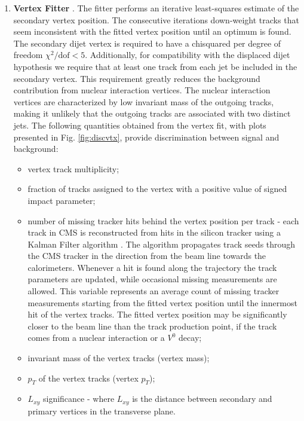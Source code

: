 \begin{enumerate}

\item{\bf Vertex Fitter}
\label{subsec:AVF}
\cite{Waltenberger:1166320}. The fitter performs an iterative least-squares estimate of the
 secondary vertex position. The consecutive iterations down-weight tracks that seem inconsistent
with the fitted vertex position until an optimum is found.
 The secondary dijet vertex is required to have a chisquared per degree of freedom 
$\chi^2/\text{dof} < 5$. Additionally, for compatibility with the displaced dijet hypothesis we require that at least 
one track from each jet be included in the secondary vertex. 
This requirement greatly reduces the background contribution
from nuclear interaction vertices. The nuclear interaction vertices are characterized by low invariant mass
of the outgoing tracks, making it unlikely that the outgoing tracks are associated with
two distinct jets. 
The following quantities obtained from the vertex fit, with plots presented in Fig.
\ref{fig:discvtx}, provide discrimination between signal and background:
\begin{itemize}
 \item vertex track multiplicity;
 \item fraction of tracks assigned to the vertex with a positive value of signed impact parameter;
 \item number of missing tracker hits behind the vertex position per track - each track in CMS is reconstructed 
from hits in the silicon tracker using a Kalman Filter algorithm \cite{Giordano:2012hr}. The algorithm propagates
 track seeds through the CMS tracker in the direction from the beam line towards the calorimeters. Whenever a hit 
is found along the trajectory the track parameters are updated, while occasional missing measurements 
are allowed. 
This variable represents an average count of missing tracker measurements 
starting from the fitted vertex position until the innermost hit of the vertex tracks. The fitted vertex position
may be significantly closer to the beam line than the track production point, if the track comes from a nuclear
 interaction or a $V^0$ decay;
 \item invariant mass of the vertex tracks (vertex mass);
 \item $p_T$ of the vertex tracks (vertex $p_T$);
 \item $L_{xy}$ significance - where $L_{xy}$ is the distance between secondary and primary vertices
in the transverse plane.
\end{itemize}



\end{enumerate}
